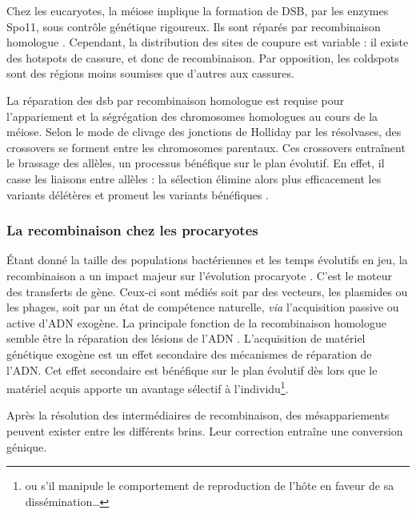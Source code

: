 \documentclass[11pt, oneside]{scrartcl}
\begin{document}
Chez les eucaryotes, la méiose implique la formation de DSB, par les enzymes
Spo11, sous contrôle génétique rigoureux. Ils sont réparés par recombinaison
homologue \cite{chapman_playing_2012}. Cependant, la distribution des sites de
coupure est variable : il existe des hotspots de cassure, et donc de
recombinaison. Par opposition, les coldspots sont des régions moins soumises que
d'autres aux cassures.

La réparation des \ac{dsb} par recombinaison homologue est requise pour
l'appariement et la ségrégation des chromosomes homologues au cours de la
méiose. Selon le mode de clivage des jonctions de Holliday par les résolvases,
des crossovers se forment entre les chromosomes parentaux. Ces crossovers
entraînent le brassage des allèles, un processus bénéfique sur le plan
évolutif\cite{webster_direct_2012}. En effet, il casse les liaisons entre
allèles : la sélection élimine alors plus efficacement les variants délétères et
promeut les variants bénéfiques \cite{otto_resolving_2002}.

\subsubsection{La recombinaison chez les procaryotes}
\label{sec:orgheadline4}

Étant donné la taille des populations bactériennes et les temps évolutifs en
jeu, la recombinaison a un impact majeur sur l'évolution procaryote
\cite{didelot_impact_2010}. C'est le moteur des transferts de gène. Ceux-ci sont
médiés soit par des vecteurs, les plasmides ou les phages, soit par un état de
compétence naturelle, \emph{via} l'acquisition passive ou active d'ADN exogène. La
principale fonction de la recombinaison homologue semble être la réparation
des lésions de l'ADN \cite{fall_horizontal_2007}. L'acquisition de matériel
génétique exogène est un effet secondaire des mécanismes de réparation de l'ADN.
Cet effet secondaire est bénéfique sur le plan évolutif dès lors que le matériel
acquis apporte un avantage sélectif à l'individu\footnote{ou s'il manipule le
comportement de reproduction de l'hôte en faveur de sa dissémination…}.

\begin{transition}
Après la résolution des intermédiaires de recombinaison, des mésappariements
peuvent exister entre les différents brins. Leur correction entraîne une
conversion génique.
\end{transition}
\end{document}
